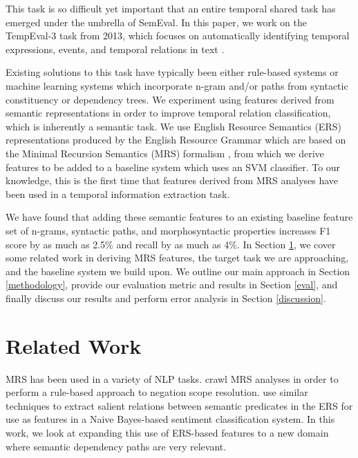 \documentclass[11pt]{article}
\begin{document}
This task is so difficult yet important that an entire temporal shared task has emerged under the umbrella of SemEval. In this paper, we work on the TempEval-3 task from 2013, which focuses on automatically identifying temporal expressions, events, and temporal relations in text \cite{UzZaman:13}.

Existing solutions to this task have typically been either rule-based systems or machine learning systems which incorporate n-gram and/or paths from syntactic constituency or dependency trees. We experiment using features derived from semantic representations in order to improve temporal relation classification, which is inherently a semantic task. We use English Resource Semantics (ERS) representations produced by the English Resource Grammar \cite{Flickinger:00} which are based on the Minimal Recursion Semantics (MRS) formalism \cite{Copestake:05}, from which we derive features to be added to a baseline system which uses an SVM classifier. To our knowledge, this is the first time that features derived from MRS analyses have been used in a temporal information extraction task.

We have found that adding these semantic features to an existing baseline feature set of n-grams, syntactic paths, and morphosyntactic properties increases F1 score by as much as 2.5\% and recall by as much as 4\%. In Section \ref{related-work}, we cover some related work in deriving MRS features, the target task we are approaching, and the baseline system we build upon. We outline our main approach in Section \ref{methodology}, provide our evaluation metric and results in Section \ref{eval}, and finally discuss our results and perform error analysis in Section \ref{discussion}.


\section{Related Work}
\label{related-work}


MRS has been used in a variety of NLP tasks.  crawl MRS analyses in order to perform a rule-based approach to negation scope resolution.  use similar techniques to extract salient relations between semantic predicates in the ERS for use as features in a Naive Bayes-based sentiment classification system. In this work, we look at expanding this use of ERS-based features to a new domain where semantic dependency paths are very relevant.
\end{document}
